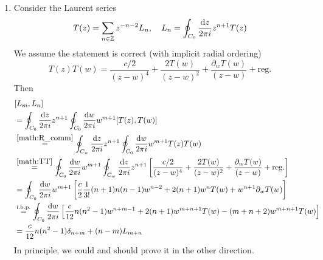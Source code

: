 \begin{enumerate}[label=(\alph*)]
	\item Consider the Laurent series
		\begin{equation}
			T(z) = \sum_{n \in \mathbb{Z}} z^{-n-2} L_n, \quad L_n = \oint_{C_0} \frac{\dd{z}}{2\pi i} z^{n+1} T(z)
		\end{equation}
		We assume the statement is correct (with implicit radial ordering)
		\begin{equation}
			T(z)T(w) = \frac{c/2}{(z-w)^4} + \frac{2T(w)}{(z-w)^2} + \frac{\partial_w T(w)}{(z-w)} + \text{reg.} \label{math:TT}
		\end{equation}
		Then
		\begin{align*}
			&\comm{L_m}{L_n} \\
			 &= \oint_{C_0} \frac{\dd{z}}{2\pi i} z^{n+1} \oint_{C_0} \frac{\dd{w}}{2\pi i} w^{m+1} \comm{T(z)}{T(w)} \\
								 &\stackrel{\eqref{math:R_comm}}{=} \oint_{C_w} \frac{\dd{z}}{2\pi i} z^{n+1} \oint_{C_0} \frac{\dd{w}}{2\pi i} w^{m+1} T(z)T(w) \\
								 &\stackrel{\eqref{math:TT}}{=} \oint_{C_0} \frac{\dd{w}}{2\pi i} w^{m+1} \oint_{C_w} \frac{\dd{z}}{2\pi i} z^{n+1} \left[ \frac{c/2}{(z-w)^4} + \frac{2T(w)}{(z-w)^2} + \frac{\partial_w T(w)}{(z-w)} + \text{reg.} \right] \\
								 &= \oint_{C_0} \frac{\dd{w}}{2\pi i} w^{m+1} \left[ \frac{c}{2} \frac{1}{3!} (n+1) n  (n-1) w^{n-2} + 2(n+1)w^n  T(w) + w^{n+1}\partial_w T(w)  \right]	\\
								 &\stackrel{\text{i.b.p.}}{=} \oint_{C_0} \frac{\dd{w}}{2\pi i} \left[ \frac{c}{12}  n(n^2 -1) w^{n+m-1} + 2(n+1)w^{m+n+1}  T(w) - (m+n+2) w^{m+n+1} T(w)  \right] \\
								 &= \frac{c}{12} n (n^2-1) \delta_{n+m} + (n-m) L_{m+n}
		\end{align*}
		In principle, we could and should prove it in the other direction.
\end{enumerate}
